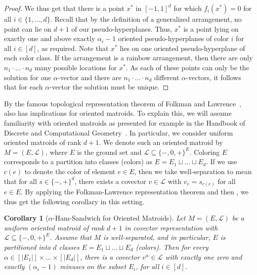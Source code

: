 \documentclass[11pt]{article}
\newtheorem{corollary}[theorem]{Corollary}
\begin{document}
\begin{proof}
We thus get that there is a point $x^*$ in $[-1,1]^d$ for which $f_i(x^*)=0$ for all $i\in\{1,\ldots,d\}$.
Recall that by the definition of a generalized arrangement, no point can lie on $d + 1$ of our pseudo-hyperplanes. Thus, $x^*$ is a point lying on exactly one and above exactly $\alpha_i - 1$ oriented pseudo-hyperplanes of color $i$ for all $i \in [d]$, as required.
%
Note that $x^*$ lies on one oriented pseudo-hyperplane of each color class. If the arrangement is a rainbow arrangement, then there are only $n_1\cdot\ldots\cdot n_d$ many possible locations for $x^*$. As each of these points can only be the solution for one $\alpha$-vector and there are $n_1\cdot\ldots\cdot n_d$ different $\alpha$-vectors, it follows that for each $\alpha$-vector the solution must be unique.
\end{proof}
%
By the famous topological representation theorem of Folkman and Lawrence~\cite{folkmanOrientedMatroids1978},  also has implications for oriented matroids. To explain this, we will assume familiarity with oriented matroids as presented for example in the Handbook of Discrete and Computational Geometry~\cite{richter-gebertOrientedMatroids1997}. In particular, we consider uniform oriented matroids of rank $d + 1$. We denote such an oriented matroid by $M = (E, \mathcal{L})$, where $E$ is the ground set and $\mathcal{L} \subseteq \{-, 0, +\}^E$. Coloring $E$ corresponds to a partition into classes (colors) as $E = E_1 \sqcup \dots \sqcup E_d$. If we use $c(e)$ to denote the color of element $e \in E$, then we take well-separation to mean that for all $s \in \{- , + \}^d$, there exists a covector $v \in \mathcal{L}$ with $v_e = s_{c(e)}$ for all $e \in E$. By applying the Folkman-Lawrence representation theorem and then , we thus get the following corollary in this setting. 
%
\begin{corollary}[$\alpha$-Ham-Sandwich for Oriented Matroids]\label{cor:matroids}
    Let $M = (E, \mathcal{L})$ be a uniform oriented matroid of rank $d + 1$ in covector representation with $\mathcal{L} \subseteq \{-, 0, +\}^E$. Assume that $M$ is well-separated, and in particular, $E$ is partitioned into $d$ classes $E = E_1 \sqcup \dots \sqcup E_d$ (colors). Then for every $\alpha \in [|E_1|] \times \dots \times [|E_d|]$, there is a covector $v^{\alpha} \in \mathcal{L}$ with exactly one zero and exactly $(\alpha_i - 1)$ minuses on the subset $E_i$, for all $i \in [d]$. 
\end{corollary}
%
\end{document}

